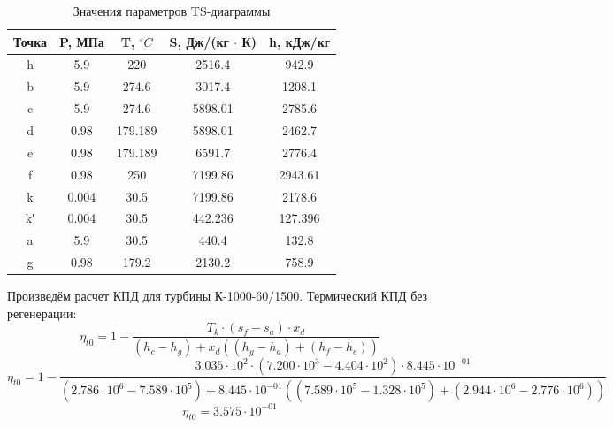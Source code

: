 \begin{table}[H]
	\caption{Значения параметров TS-диаграммы}
	\begin{center}
        \begin{tabular}{|c|c|c|c|c|}
        \toprule
         Точка & P, МПа & T, $^\circ C$ & S, Дж/(кг $\cdot$ К) & h, кДж/кг \\ 
         \midrule
         \hline
          h & 5.9 & 220 & 2516.4 & 942.9\\ 
         \hline
          b & 5.9 & 274.6 & 3017.4 & 1208.1 \\ 
         \hline
          c & 5.9 & 274.6 & 5898.01 & 2785.6\\ 
         \hline
          d & 0.98 & 179.189 & 5898.01 & 2462.7 \\ 
         \hline
          e & 0.98 & 179.189 & 6591.7 & 2776.4 \\ 
         \hline
          f & 0.98 & 250  & 7199.86 & 2943.61 \\ 
         \hline
          k & 0.004 & 30.5 & 7199.86 & 2178.6 \\ 
         \hline
          k′ & 0.004 & 30.5 & 442.236 & 127.396 \\ 
         \hline
          a & 5.9  & 30.5 & 440.4 & 132.8 \\ 
         \hline
          g & 0.98 & 179.2 & 2130.2 & 758.9 \\ 
         \bottomrule
		\end{tabular}
		\label{tabular:coeffs}
	\end{center}
\end{table}

Произведём расчет КПД для турбины К-1000-60/1500. Термический КПД без регенерации:
\begin{equation}
\eta_{t0}=1 - 
\frac{T_{k} ⋅ \left( s_{f} - s_{a} \right) ⋅ x_{d}}
{\left( h_{c} - h_{g} \right) +x_{d}\left( \left( h_{g} - h_{a} \right) + \left( h_{f} - h_{e} \right) \right)}
\end{equation}
\begin{equation}
\eta_{t0} = 
1 - 
\frac{3.035 \cdot 10^{ 2 } ⋅ \left( 7.200 \cdot 10^{ 3 } - 4.404 \cdot 10^{ 2 } \right) ⋅ 8.445 \cdot 10^{ -01 }}
{\left( 2.786 \cdot 10^{ 6 } - 7.589 \cdot 10^{ 5 } \right) + 8.445 \cdot 10^{ -01 } \left( \left( 7.589 \cdot 10^{ 5 } - 1.328 \cdot 10^{ 5 } \right) + \left( 2.944 \cdot 10^{ 6 } - 2.776 \cdot 10^{ 6 } \right) \right)}
\end{equation}
\begin{equation}
\eta_{t0}=3.575 \cdot 10^{ -01 }
\end{equation}

